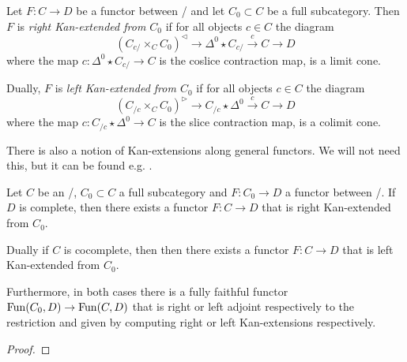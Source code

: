 \begin{definition} %
    Let $F\colon C\to D$ be a functor between \inftycats/ and let $C_0\subset C$ be a full subcategory.
    Then $F$ is \emph{right Kan-extended from $C_0$} if for all objects $c\in C$ the diagram
    \begin{equation*}
        \left(C_{c/}\times_C C_0\right)^{\lhd}\to \Delta^0\star C_{c/}\xrightarrow{c} C\to D
    \end{equation*}
    where the map $c\colon\Delta^0\star C_{c/}\to C$ is the coslice contraction map, is a limit cone.

    Dually, $F$ is \emph{left Kan-extended from $C_0$} if for all objects $c\in C$ the diagram
    \begin{equation*}
        \left(C_{/c}\times_C C_0\right)^{\rhd}\to C_{/c}\star\Delta^0 \xrightarrow{c} C\to D
    \end{equation*}
    where the map $c\colon C_{/c}\star\Delta^0\to C$ is the slice contraction map, is a colimit cone.
\end{definition}
\begin{remark}
    There is also a notion of Kan-extensions along general functors. 
    We will not need this, but it can be found e.g. %
    .
\end{remark}
\begin{prop}\label{prop:exKanExt} %
    Let $C$ be an \inftycat/, $C_0\subset C$ a full subcategory and $F\colon C_0\to D$ a functor between \inftycats/.
    If $D$ is complete, then there exists a functor $F\colon C\to D$ that is right Kan-extended from $C_0$.

    Dually if $C$ is cocomplete, then then there exists a functor $F\colon C\to D$ that is left Kan-extended from $C_0$.
    
    Furthermore, in both cases there is a fully faithful functor $\operatorname{Fun}(C_0,D)\to\operatorname{Fun}(C,D)$ that is right or left adjoint respectively to the restriction and given by computing right or left Kan-extensions respectively.
    \begin{proof}
    \end{proof}
\end{prop}
